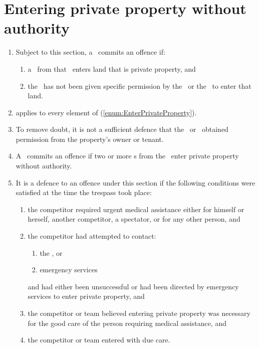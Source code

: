 \documentclass[12pt]{report}
\begin{document}
  \section{Entering private property without authority}
  \begin{enumerate}
    \item Subject to this section, a \team\ commits an offence if:\label{enum:EnterPrivateProperty}
    \begin{enumerate}
      \item a \competitor\ from that \team\ enters land that is private property, and
      \item the \team\ has not been given specific permission by the \RaceDirector\ or the \Referee\ to enter that land.
    \end{enumerate}
    \item {} applies to every element of \thesection(\ref{enum:EnterPrivateProperty}).
    \item To remove doubt, it is not a sufficient defence that the \competitor\ or \team\ obtained permission from the property's owner or tenant.
        \item A \squad\ commits an offence if two or more \team s from the \squad\ enter private property without authority.

    \item It is a defence to an offence under this section if the following conditions were satisfied at the time the trespass took place:
        \begin{enumerate}
          \item the competitor required urgent medical assistance either for himself or herself, another competitor, a spectator, or for any other person, and
          \item the competitor had attempted to contact:
          \begin{enumerate}
            \item the \RaceDirector, or
            \item emergency services
          \end{enumerate}
          and had either been unsuccessful or had been directed by emergency services to enter private property, and
          \item the competitor or team believed entering private property was necessary for the good care of the person requiring medical assistance, and
          \item the competitor or team entered with due care.



        \end{enumerate}


  \end{enumerate}
\end{document}
